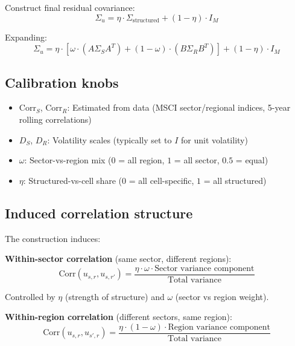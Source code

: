\documentclass[11pt,a4paper]{article}
\begin{document}
Construct final residual covariance:
\begin{equation}
\Sigma_u = \eta \cdot \Sigma_{\text{structured}} + (1-\eta) \cdot I_M
\end{equation}

Expanding:
\begin{equation}
\boxed{\Sigma_u = \eta \cdot [\omega \cdot (A \Sigma_S A^T) + (1-\omega) \cdot (B \Sigma_R B^T)] + (1-\eta) \cdot I_M}
\end{equation}

\subsection{Calibration knobs}

\begin{itemize}
    \item $\text{Corr}_S$, $\text{Corr}_R$: Estimated from data (MSCI sector/regional indices, 5-year rolling correlations)
    \item $D_S$, $D_R$: Volatility scales (typically set to $I$ for unit volatility)
    \item $\omega$: Sector-vs-region mix ($0$ = all region, $1$ = all sector, $0.5$ = equal)
    \item $\eta$: Structured-vs-cell share ($0$ = all cell-specific, $1$ = all structured)
\end{itemize}

\subsection{Induced correlation structure}

The construction induces:

\textbf{Within-sector correlation} (same sector, different regions):
\begin{equation}
\text{Corr}(u_{s,r}, u_{s,r'}) = \frac{\eta \cdot \omega \cdot \text{Sector variance component}}{\text{Total variance}}
\end{equation}

Controlled by $\eta$ (strength of structure) and $\omega$ (sector vs region weight).

\textbf{Within-region correlation} (different sectors, same region):
\begin{equation}
\text{Corr}(u_{s,r}, u_{s',r}) = \frac{\eta \cdot (1-\omega) \cdot \text{Region variance component}}{\text{Total variance}}
\end{equation}
\end{document}
